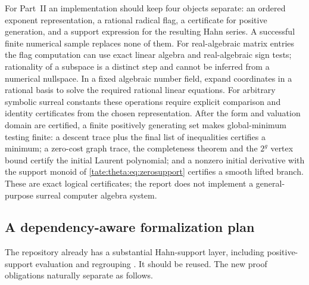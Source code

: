 \documentclass[11pt,letterpaper]{article}
\theoremstyle{definition}
\begin{document}
For Part~II an implementation should keep four objects separate: an
ordered exponent representation, a rational radical flag, a certificate
for positive generation, and a support expression for the resulting Hahn
series. A successful finite numerical sample replaces none of them. For
real-algebraic matrix entries the flag computation can use exact linear
algebra and real-algebraic sign tests; rationality of a subspace is a
distinct step and cannot be inferred from a numerical nullspace. In a fixed
algebraic number field, expand coordinates in a rational basis to solve the
required rational linear equations. For arbitrary symbolic surreal
constants these operations require explicit comparison and identity
certificates from the chosen representation. After the form and valuation
domain are certified, a finite positively generating set makes
global-minimum testing finite: a descent trace plus the final list of
inequalities certifies a minimum; a zero-cost graph trace, the completeness
theorem and the $2^g$ vertex bound certify the initial Laurent polynomial;
and a nonzero initial derivative with the support monoid of
\eqref{tate:theta:eq:zerosupport} certifies a smooth lifted branch. These are
exact logical certificates; the report does not implement a general-purpose
surreal computer algebra system.

\subsection{A dependency-aware formalization plan}

The repository already has a substantial Hahn-support layer, including
positive-support evaluation and regrouping \cite{Repo}. It should be
reused. The new proof obligations naturally separate as follows.
\end{document}
